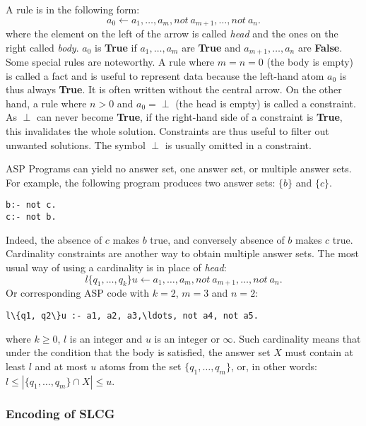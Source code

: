 A rule is in the following form:
$$a_0 \gets a_1 , \ldots , a_m, not\ a_{m+1}, \ldots , not\ a_n.$$
where the element on the left of the arrow is called \textit{head} and the ones on the right called \textit{body}.
$a_0$ is \textbf{True} if $a_1 , \ldots , a_m$ are \textbf{True} and $a_{m+1}, \ldots , a_n$ are \textbf{False}.
Some special rules are noteworthy. 
A rule where $m = n = 0$ (the body is empty) is called a fact and is useful to represent data because the left-hand atom $a_0$ is thus always \textbf{True}.
It is often written without the central arrow.
On the other hand, a rule where $n > 0$ and $a_0 = \perp$ (the head is empty) is called a constraint.
As $\perp$ can never become \textbf{True}, if the right-hand side of a constraint is \textbf{True}, this invalidates the whole solution.
Constraints are thus useful to filter out unwanted solutions.
The symbol $\perp$ is usually omitted in a constraint.

ASP Programs can yield no answer set, one answer set, or multiple answer sets. 
For example, the following program produces two answer sets: $\{b\}$ and $\{c\}$.

\begin{Verbatim}[commandchars=\\\{\}]
b:- not c. 
c:- not b.
\end{Verbatim}

Indeed, the absence of $c$ makes $b$ true, and conversely absence of $b$ makes $c$ true. 
Cardinality constraints are another way to obtain multiple answer sets. 
The most usual way of using a cardinality is in place of \textit{head}:
$$l \{q_1, \ldots , q_k \} u \gets a_1, \ldots , a_m, not\ a_{m+1}, \ldots , not\ a_n.$$
Or corresponding ASP code with $k=2$, $m=3$ and $n=2$:
\begin{Verbatim}[commandchars=\\\{\}]
l\{q1, q2\}u :- a1, a2, a3,\ldots, not a4, not a5.
\end{Verbatim}
where $k \geq 0$, $l$ is an integer and $u$ is an integer or $\infty$. 
Such cardinality means that under the condition that the body is satisfied, the answer set $X$ must contain at least $l$ and at most $u$ atoms from the set $\{q_1, \ldots  , q_m\}$, or, in other words: $l \leq |\{q_1, \ldots  , q_m\} \cap X| \leq u$. %

\subsubsection{Encoding of SLCG}

